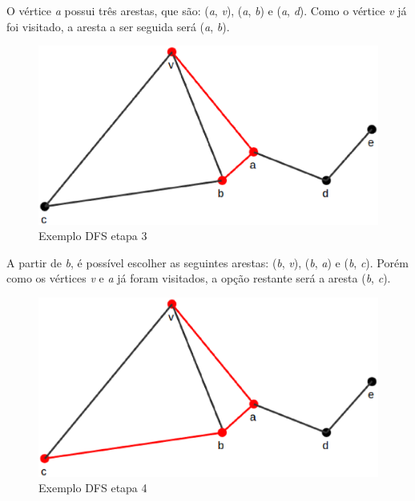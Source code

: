 O vértice \textit{a} possui três arestas, que são: (\textit{a}, \textit{v}), (\textit{a}, \textit{b}) e (\textit{a}, \textit{d}). Como o vértice \textit{v} já foi visitado, a aresta a ser seguida será (\textit{a}, \textit{b}).

\begin{figure}[!h]
	\centering
	\includegraphics[scale=0.25]{figuras/capitulo2/dfs/dfs3.eps}
	\caption[Exemplo DFS etapa 3]{Exemplo DFS etapa 3 \cite{Cormen:2001}}
	\label{dfs3}
\end{figure}

A partir de \textit{b}, é possível escolher as seguintes arestas: (\textit{b}, \textit{v}), (\textit{b}, \textit{a}) e (\textit{b}, \textit{c}). Porém como os vértices \textit{v} e \textit{a} já foram visitados, a opção restante será a aresta (\textit{b}, \textit{c}).

\newpage

\begin{figure}[!h]
	\centering
	\includegraphics[scale=0.25]{figuras/capitulo2/dfs/dfs4.eps}
	\caption[Exemplo DFS etapa 4]{Exemplo DFS etapa 4 \cite{Cormen:2001}}
	\label{dfs4}
\end{figure}

